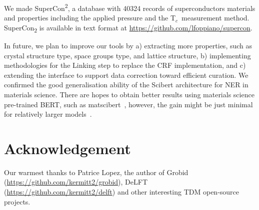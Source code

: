\documentclass{article}
\newcommand{\tc}{T$_{c}$}
\begin{document}
We made SuperCon\textsuperscript{2}, a database with 40324 records of superconductors materials and properties including the applied pressure and the \tc~measurement method. 
SuperCon\textsubscript{2} is available in text format at \url{https://github.com/lfoppiano/supercon}.

In future, we plan to improve our tools by a) extracting more properties, such as crystal structure type, space groups type, and lattice structure, b) implementing methodologies for the Linking step to replace the CRF implementation, and c) extending the interface to support data correction toward efficient curation.
We confirmed the good generalisation ability of the Scibert architecture for NER in materials science. 
There are hopes to obtain better results using materials science pre-trained BERT, such as matscibert~\cite{gupta_matscibert_2022}, however, the gain might be just minimal for relatively larger models~\cite{hong2022ScholarBERT}.

\section{Acknowledgement}
\label{sec:acknowledgement}
Our warmest thanks to Patrice Lopez, the author of Grobid (\url{https://github.com/kermitt2/grobid}), DeLFT (\url{https://github.com/kermitt2/delft}) and other interesting TDM open-source projects.



\end{document}
